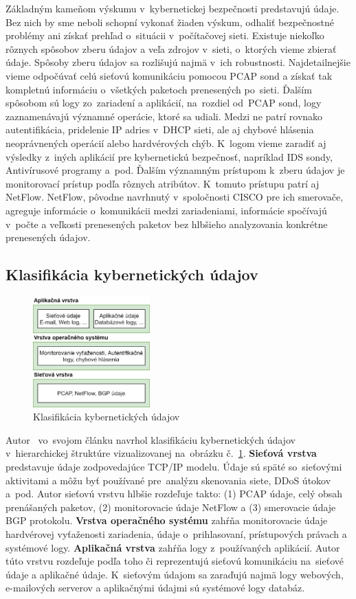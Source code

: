 \documentclass[thesismargins, thesislinespacing, openright, upjsfrontpage]{rnthesis}
\begin{document}
Základným kameňom výskumu v~kybernetickej bezpečnosti predstavujú údaje. Bez nich by sme neboli schopní vykonať žiaden výskum, odhaliť bezpečnostné problémy ani získať prehľad o~situácii v~počítačovej sieti. Existuje niekoľko rôznych spôsobov zberu údajov a veľa zdrojov v~sieti, o~ktorých vieme zbierať údaje. Spôsoby zberu údajov sa rozlišujú najmä v~ich robustnosti. Najdetailnejšie vieme odpočúvať celú sieťovú komunikáciu pomocou PCAP sond a získať tak kompletnú informáciu o~všetkých paketoch prenesených po~sieti. Ďalším spôsobom sú logy zo~zariadení a aplikácií, na~rozdiel od~PCAP sond, logy zaznamenávajú významné operácie, ktoré sa udiali. Medzi ne patrí rovnako autentifikácia, pridelenie IP adries v~DHCP sieti, ale aj chybové hlásenia neoprávnených operácií alebo hardvérových chýb. K~logom vieme zaradiť aj výsledky z~iných aplikácií pre kybernetickú bezpečnosť, napríklad IDS sondy, Antivírusové programy a~pod. Ďalším významným prístupom k~zberu údajov je monitorovací prístup podľa rôznych atribútov. K~tomuto prístupu patrí aj NetFlow. NetFlow, pôvodne navrhnutý v~spoločnosti CISCO pre ich smerovače, agreguje informácie o~komunikácii medzi zariadeniami, informácie spočívajú v~počte a veľkosti prenesených paketov bez hlbšieho analyzovania konkrétne prenesených údajov.

\subsection{Klasifikácia kybernetických údajov}

\begin{figure}[h]
  \centering
  \includegraphics[width=0.4\textwidth]{images/cyberdata.png}
  \caption{Klasifikácia kybernetických údajov}
  \label{fig:cyberdata}
\end{figure}

Autor~\cite{wang2013cyber} vo~svojom článku navrhol klasifikáciu kybernetických údajov v~hierarchickej štruktúre vizualizovanej na~obrázku č.~\ref{fig:cyberdata}. \textbf{Sieťová vrstva} predstavuje údaje zodpovedajúce TCP/IP modelu. Údaje sú späté so~sieťovými aktivitami a môžu byť používané pre~analýzu skenovania siete, DDoS útokov a~pod. Autor sieťovú vrstvu hlbšie rozdeľuje takto: (1) PCAP údaje, celý obsah prenášaných paketov, (2) monitorovacie údaje NetFlow a (3) smerovacie údaje BGP protokolu. \textbf{Vrstva operačného systému} zahŕňa monitorovacie údaje hardvérovej vyťaženosti zariadenia, údaje o~prihlasovaní, prístupových právach a systémové logy. \textbf{Aplikačná vrstva} zahŕňa logy z~používaných aplikácií. Autor túto vrstvu rozdeľuje podľa toho či reprezentujú sieťovú komunikáciu na~sieťové údaje a aplikačné údaje. K~sieťovým údajom sa zaraďujú najmä logy webových, e-mailových serverov a aplikačnými údajmi sú systémové logy databáz.
\end{document}
